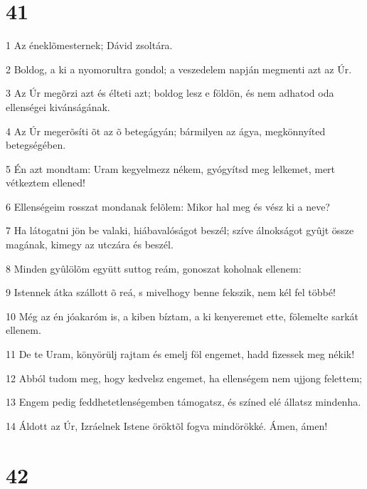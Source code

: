\chapter{41}

\par 1 Az éneklõmesternek; Dávid zsoltára.
\par 2 Boldog, a ki a nyomorultra gondol; a veszedelem napján megmenti azt az Úr.
\par 3 Az Úr megõrzi azt és élteti azt; boldog lesz e földön, és nem adhatod oda ellenségei kivánságának.
\par 4 Az Úr megerõsíti õt az õ betegágyán; bármilyen az ágya, megkönnyíted betegségében.
\par 5 Én azt mondtam: Uram kegyelmezz nékem, gyógyítsd meg lelkemet, mert vétkeztem ellened!
\par 6 Ellenségeim rosszat mondanak felõlem: Mikor hal meg és vész ki a neve?
\par 7 Ha látogatni jön be valaki, hiábavalóságot beszél; szíve álnokságot gyûjt össze magának, kimegy az utczára és beszél.
\par 8 Minden gyûlölõm együtt suttog reám, gonoszat koholnak ellenem:
\par 9 Istennek átka szállott õ reá, s mivelhogy benne fekszik, nem kél fel többé!
\par 10 Még az én jóakaróm is, a kiben bíztam, a ki kenyeremet ette, fölemelte sarkát ellenem.
\par 11 De te Uram, könyörülj rajtam és emelj föl engemet, hadd fizessek meg nékik!
\par 12 Abból tudom meg, hogy kedvelsz engemet, ha ellenségem nem ujjong felettem;
\par 13 Engem pedig feddhetetlenségemben támogatsz, és színed elé állatsz mindenha.
\par 14 Áldott az Úr, Izráelnek Istene öröktõl fogva mindörökké. Ámen, ámen!

\chapter{42}

